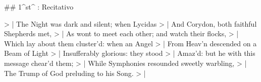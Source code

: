 ## 1^st^ \mvmt: Recitativo

\beginnumbering
\pstart
> | The Night was dark and silent; when Lycidas
> | And Corydon, both faithful Shepherds met,
> | As wont to meet each other; and watch their flocks,
> | Which lay about them cluster’d: when an Angel
> | From Heav’n descended on a Beam of Light
> | Insufferably glorious: they stood
> | Amaz’d: but he with this message chear’d them;
> | While Symphonies resounded sweetly warbling,
> | The Trump of God preluding to his Song.
> | \pend
\endnumbering
